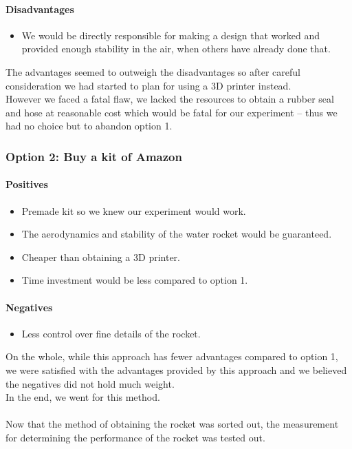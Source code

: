 \documentclass[14pt]{article}
\begin{document}
\paragraph{Disadvantages}
\begin{itemize}
    \item We would be directly responsible for making a design that worked and provided enough stability in the air, when others have already done that.

\end{itemize}
The advantages seemed to outweigh the disadvantages so after careful consideration we had started to plan for using a 3D printer instead.\\
However we faced a fatal flaw, we lacked the resources to obtain a rubber seal and hose at reasonable cost which would be fatal for our experiment -- thus we had no choice but to abandon option 1.
\subsubsection{Option 2: Buy a kit of Amazon}
\paragraph{Positives}
\begin{itemize}
    \item Premade kit so we knew our experiment would work.
    \item The aerodynamics and stability of the water rocket would be guaranteed.
    \item Cheaper than obtaining a 3D printer.
    \item Time investment would be less compared to option 1.
\end{itemize}
\paragraph{Negatives}
\begin{itemize}
    \item Less control over fine details of the rocket.
\end{itemize}
On the whole, while this approach has fewer advantages compared to option 1, we were satisfied with the advantages provided by this approach and we believed the negatives did not hold much weight. 
\\In the end, we went for this method.
\\\\
Now that the method of obtaining the rocket was sorted out, the measurement for determining the performance of the rocket was tested out.
\end{document}
